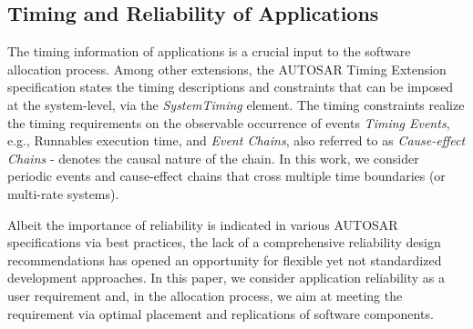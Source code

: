\subsection{Timing and Reliability of Applications}
The timing information of applications is a crucial input to the software allocation process. Among other extensions, the AUTOSAR Timing Extension specification \cite{AUTOSAR2017SpecificationExtensions} states the timing descriptions and constraints that can be imposed at the system-level, via the \textit{SystemTiming} element. The timing constraints realize the timing requirements on the observable occurrence of events \textit{Timing Events}, e.g., Runnables execution time, and \textit{Event Chains}, also referred to as \textit{Cause-effect Chains} - denotes the causal nature of the chain. In this work, we consider periodic events and cause-effect chains that cross multiple time boundaries (or multi-rate systems).

Albeit the importance of reliability is indicated in various AUTOSAR specifications via best practices, the lack of a comprehensive reliability design recommendations has opened an opportunity for flexible yet not standardized development approaches. In this paper, we consider application reliability as a user requirement and, in the allocation process, we aim at meeting the requirement via optimal placement and replications of software components.